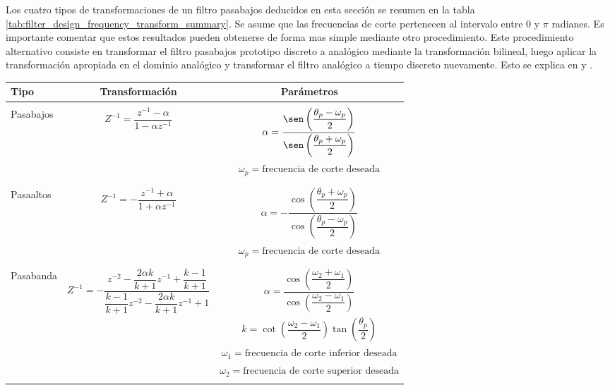 \documentclass[a4paper]{report}
\begin{document}
Los cuatro tipos de transformaciones de un filtro pasabajos deducidos en esta sección se resumen en la tabla \ref{tab:filter_design_frequency_transform_summary}. Se asume que las frecuencias de corte pertenecen al intervalo entre 0 y \(\pi\) radianes. Es importante comentar que estos resultados pueden obtenerse de forma mas simple mediante otro procedimiento. Este procedimiento alternativo consiste en transformar el filtro pasabajos prototipo discreto a analógico mediante la transformación bilineal, luego aplicar la transformación apropiada en el dominio analógico y transformar el filtro analógico a tiempo discreto nuevamente. Esto se explica en \cite{swamy1977frequency} y \cite{roy2005simple}.
\begin{table}[ht!]
\begin{center}
\begin{tabular}{|l|c|c|} \hline
\textbf{Tipo} & \textbf{Transformación} & \textbf{Parámetros}\\ \hline \hline
 & & \\
Pasabajos & \(Z^{-1}=\dfrac{z^{-1}-\alpha}{1-\alpha z^{-1}}\)
 & \(\alpha=\dfrac{\sen\left(\dfrac{\theta_p-\omega_p}{2}\right)}{\sen\left(\dfrac{\theta_p+\omega_p}{2}\right)}\) \\
 & & \(\omega_p=\textrm{frecuencia de corte deseada}\) \\
 & & \\ \hline
 & & \\
Pasaaltos & \(Z^{-1}=-\dfrac{z^{-1}+\alpha}{1+\alpha z^{-1}}\) 
 & \(\alpha=-\dfrac{\cos\left(\dfrac{\theta_p+\omega_p}{2}\right)}{\cos\left(\dfrac{\theta_p-\omega_p}{2}\right)}\) \\
 & & \(\omega_p=\textrm{frecuencia de corte deseada}\) \\
 & & \\ \hline
 & &\\
Pasabanda & \(Z^{-1}=-\dfrac{z^{-2}-\dfrac{2\alpha k}{k+1}z^{-1}+\dfrac{k-1}{k+1}}{\dfrac{k-1}{k+1}z^{-2}-\dfrac{2\alpha k}{k+1}z^{-1}+1}\)
 & \(\alpha=\dfrac{\cos\left(\dfrac{\omega_2+\omega_1}{2}\right)}{\cos\left(\dfrac{\omega_2-\omega_1}{2}\right)}\) \\
 & & \(k=\cot\left(\dfrac{\omega_2-\omega_1}{2}\right)\tan\left(\dfrac{\theta_p}{2}\right)\) \\
 & & \(\omega_1=\textrm{frecuencia de corte inferior deseada}\) \\
 & & \(\omega_2=\textrm{frecuencia de corte superior deseada}\) \\
 & &\\ \hline

\end{tabular}
\end{center}
\end{table}
\end{document}
